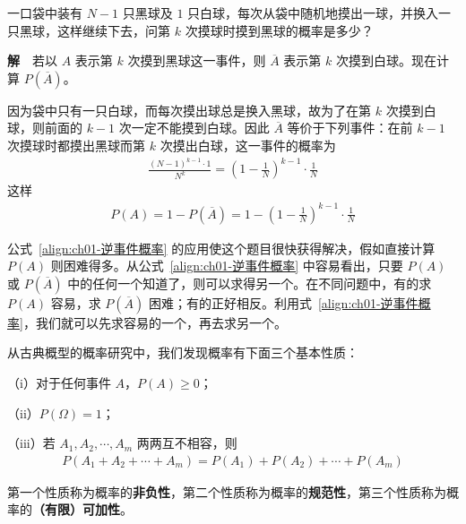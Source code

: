 \documentclass[../../main.tex]{subfiles}
\begin{document}
\begin{example}[换球问题]\label{example:ch01-换球}
一口袋中装有 $N-1$ 只黑球及 $1$ 只白球，每次从袋中随机地摸出一球，并换入一只黑球，这样继续下去，问第 $k$ 次摸球时摸到黑球的概率是多少？

\textbf{解}~~若以 $A$ 表示第 $k$ 次摸到黑球这一事件，则 $\overline{A}$ 表示第 $k$ 次摸到白球。现在计算 $P(\overline{A})$。

因为袋中只有一只白球，而每次摸出球总是换入黑球，故为了在第 $k$ 次摸到白球，则前面的 $k-1$ 次一定不能摸到白球。因此 $\overline{A}$ 等价于下列事件：在前 $k-1$ 次摸球时都摸出黑球而第 $k$ 次摸出白球，这一事件的概率为
\begin{align*}
\frac{(N-1)^{k-1}\cdot 1}{N^k}=\left(1-\frac{1}{N}\right)^{k-1}\cdot\frac{1}{N}
\end{align*}
这样
\begin{align*}
P(A)=1-P(\overline{A})=1-\left(1-\frac{1}{N}\right)^{k-1}\cdot\frac{1}{N}
\end{align*}

公式~\eqref{align:ch01-逆事件概率} 的应用使这个题目很快获得解决，假如直接计算 $P(A)$ 则困难得多。从公式~\eqref{align:ch01-逆事件概率} 中容易看出，只要 $P(A)$ 或 $P(\overline{A})$ 中的任何一个知道了，则可以求得另一个。在不同问题中，有的求 $P(A)$ 容易，求 $P(\overline{A})$ 困难；有的正好相反。利用式~\eqref{align:ch01-逆事件概率}，我们就可以先求容易的一个，再去求另一个。
\end{example}

从古典概型的概率研究中，我们发现概率有下面三个基本性质：

（i）对于任何事件 $A$，$P(A)\geqslant 0$；

（ii）$P(\Omega)=1$；

（iii）若 $A_1,A_2,\cdots,A_m$ 两两互不相容，则
\begin{align*}
P(A_1+A_2+\cdots+A_m)=P(A_1)+P(A_2)+\cdots+P(A_m)
\end{align*}

第一个性质称为概率的\textbf{非负性}，第二个性质称为概率的\textbf{规范性}，第三个性质称为概率的\textbf{（有限）可加性}。
\end{document}

